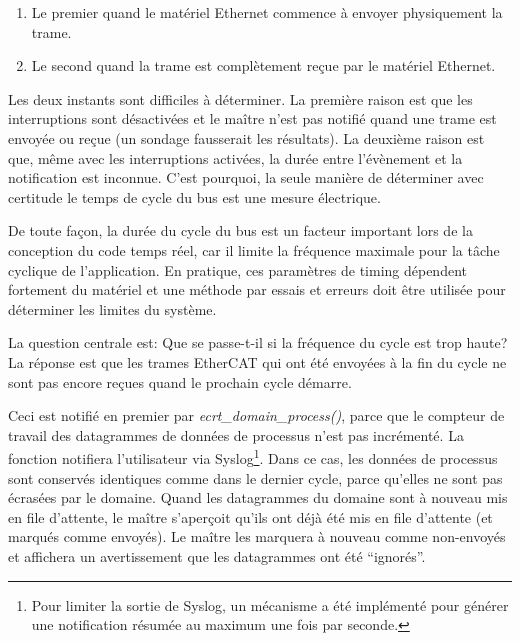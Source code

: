 \documentclass[a4paper,12pt,BCOR6mm,bibtotoc,idxtotoc]{scrbook}
\begin{document}
\begin{enumerate}

\item Le premier quand le mat\'eriel Ethernet commence \`a envoyer physiquement
  la trame.

\item Le second quand la trame est compl\`etement re\c{c}ue par le mat\'eriel
  Ethernet.

\end{enumerate}

Les deux instants sont difficiles \`a d\'eterminer.  La premi\`ere
raison est que les interruptions sont d\'esactiv\'ees et le ma\^itre
n'est pas notifi\'e quand une trame est envoy\'ee ou re\c{c}ue (un
sondage fausserait les r\'esultats).  La deuxi\`eme raison est que,
m\^eme avec les interruptions activ\'ees, la dur\'ee entre
l'\'ev\`enement et la notification est inconnue.  C'est pourquoi, la
seule mani\`ere de d\'eterminer avec certitude le temps de cycle du
bus est une mesure \'electrique.

De toute fa\c{c}on, la dur\'ee du cycle du bus est un facteur
important lors de la conception du code temps r\'eel, car il limite la
fr\'equence maximale pour la t\^ache cyclique de l'application.  En
pratique, ces param\`etres de timing d\'ependent fortement du
mat\'eriel et une m\'ethode par essais et erreurs doit \^etre
utilis\'ee pour d\'eterminer les limites du syst\`eme.

La question centrale est: Que se passe-t-il si la fr\'equence du cycle
est trop haute?  La r\'eponse est que les trames EtherCAT qui ont
\'et\'e envoy\'ees \`a la fin du cycle ne sont pas encore re\c{c}ues
quand le prochain cycle d\'emarre.

Ceci est notifi\'e en premier par \textit{ecrt\_domain\_process()},
parce que le compteur de travail des datagrammes de donn\'ees de
processus n'est pas incr\'ement\'e.  La fonction notifiera
l'utilisateur via Syslog\footnote{ Pour limiter la sortie de Syslog,
  un m\'ecanisme a \'et\'e impl\'ement\'e pour g\'en\'erer une
  notification r\'esum\'ee au maximum une fois par seconde.}.  Dans ce
cas, les donn\'ees de processus sont conserv\'es identiques comme dans
le dernier cycle, parce qu'elles ne sont pas \'ecras\'ees par le
domaine.  Quand les datagrammes du domaine sont \`a nouveau mis en
file d'attente, le ma\^itre s'aper\c{c}oit qu'ils ont d\'ej\`a \'et\'e
mis en file d'attente (et marqu\'es comme envoy\'es). Le ma\^itre les
marquera \`a nouveau comme non-envoy\'es et affichera un avertissement
que les datagrammes ont \'et\'e ``ignor\'es''.
\end{document}
